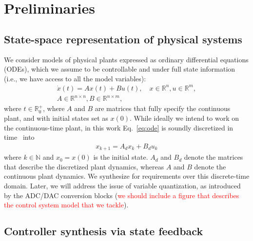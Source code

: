 \documentclass[twocolumn]{autart}    %
\begin{document}
\section{Preliminaries}
\label{sec:preliminaries}

\subsection{State-space representation of physical systems} 
\label{ssec:ssrepresentation}

We consider models of physical plants expressed as ordinary differential
equations (ODEs), which we assume to be controllable and under full state
information (i.e., we have access to all the model variables):
%
\begin{align}
\label{eq:ode}
\dot{x}(t) = Ax(t)+ B u(t), \quad x \in \mathbb{R}^{n}, u \in \mathbb{R}^m, \\ \nonumber A \in \mathbb{R}^{n \times n}, B \in \mathbb{R}^{n \times m}, 
\end{align}
%
where $t \in \mathbb R_0^+$, where $A$ and $B$ are matrices that fully
specify the continuous plant, and with initial states set as $x(0)$.  While
ideally we intend to work on the continuous-time plant, in this work
Eq.~\eqref{eq:ode} is soundly discretized in time~\cite{fadali} into
%
\begin{align}
\label{eq:plant}
x_{k+1} = A_d x_k+ B_d u_k
\end{align} 
%
where $k \in \mathbb N$ and $x_{0}=x(0)$ is the initial state. 
$A_d$ and $B_d$ denote the matrices that describe the discretized plant dynamics, whereas
$A$ and $B$ denote the continuous plant dynamics.  
We synthesize for requirements over this discrete-time domain. 
Later, we will address the issue of variable quantization, 
as introduced by the ADC/DAC conversion blocks 
(\textcolor{red}{we should include a figure that describes the control system model that we tackle}).



\subsection{Controller synthesis via state feedback}
\label{ssec:statefeedbackcontrol}
\end{document}
